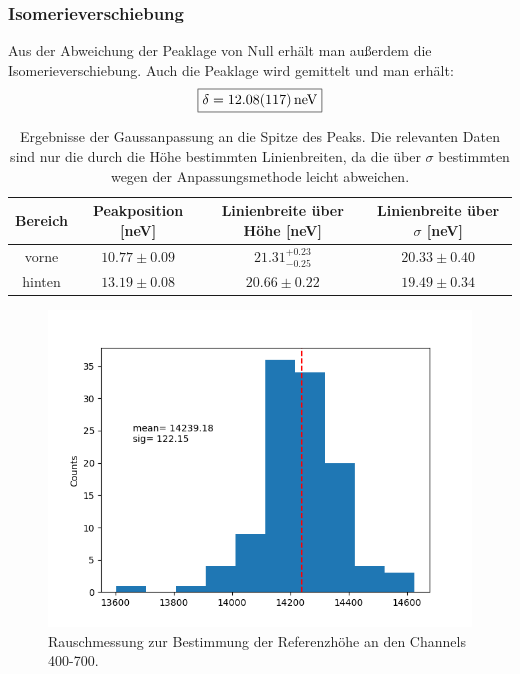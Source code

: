\documentclass[12pt,a4paper]{article}
\begin{document}
\subsubsection{Isomerieverschiebung}
Aus der Abweichung der Peaklage von Null erhält man außerdem die Isomerieverschiebung. Auch die Peaklage wird gemittelt und man erhält:
\begin{equation*}
\boxed{\delta = \SI{12.08\pm 1.17}{neV}}
\end{equation*}

\begin{table}
\centering
\begin{tabular}{|c|c|c|c|}
\hline 
Bereich & Peakposition [neV] & Linienbreite über Höhe [neV] & Linienbreite über $\sigma$ [neV]\\ 
\hline 
vorne & $10.77\pm 0.09$ & $21.31^{+0.23}_{-0.25}$ & $20.33\pm 0.40$ \\ 
\hline 
hinten & $13.19\pm 0.08$ & $20.66 \pm 0.22$ & $19.49\pm 0.34$ \\ 
\hline 
\end{tabular}
\caption{Ergebnisse der Gaussanpassung an die Spitze des Peaks. Die relevanten Daten sind nur die durch die Höhe bestimmten Linienbreiten, da die über $\sigma$ bestimmten wegen der Anpassungsmethode leicht abweichen.}
\label{tab:Ein_halbgauss}
\end{table}

\begin{figure}
\centering
\includegraphics[scale=0.8]{Bilder/Einlinien/Ein_Rausch.png}
\caption{Rauschmessung zur Bestimmung der Referenzhöhe an den Channels 400-700.}
\label{fig:Ein_Rausch}
\end{figure}
\end{document}
